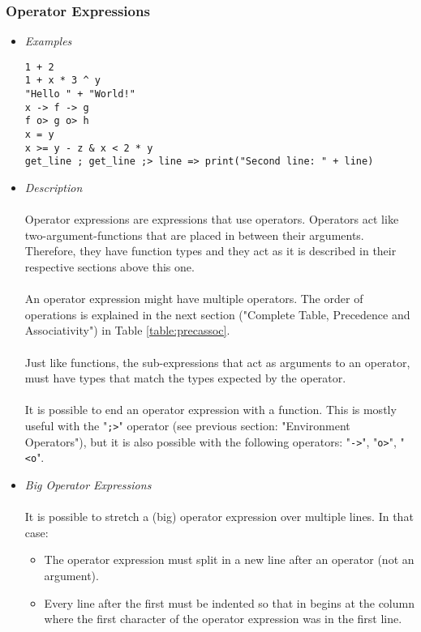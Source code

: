 \documentclass{article}
\begin{document}
\subsubsection{Operator Expressions}

\begin{itemize}
\item \textit{Examples}
\begin{verbatim}
1 + 2
1 + x * 3 ^ y
"Hello " + "World!"
x -> f -> g
f o> g o> h
x = y
x >= y - z & x < 2 * y
get_line ; get_line ;> line => print("Second line: " + line)
\end{verbatim}

\item \textit{Description}\\\\
Operator expressions are expressions that use operators. Operators act like
two-argument-functions that are placed in between their arguments. Therefore,
they have function types and they act as it is described in their respective
sections above this one.
\\\\
An operator expression might have multiple operators. The order of operations
is explained in the next section ("Complete Table, Precedence and Associativity")
in Table \ref{table:precassoc}.
\\\\
Just like functions, the sub-expressions
that act as arguments to an operator, must have types that match the types 
expected by the operator.
\\\\
It is possible to end an operator expression with a function. This is mostly
useful with the "\texttt{;>}" operator (see previous section: "Environment
Operators"), but it is also possible with the following operators:
"\texttt{->}", "\texttt{o>}", "\texttt{<o}".

\item \textit{Big Operator Expressions}\\\\
It is possible to stretch a (big) operator expression over multiple lines.
In that case:
\begin{itemize}
\item
The operator expression must split in a new line after an operator (not an
argument).

\item
Every line after the first must be indented so that in begins at the column 
where the first character of the operator expression was in the first line.


\end{itemize}
\end{itemize}
\end{document}

